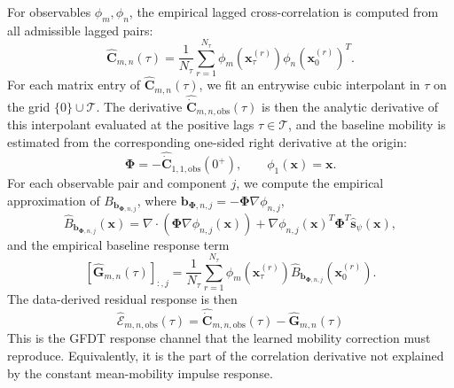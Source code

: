 \documentclass[11pt,twoside,fleqn]{article}
\begin{document}
For observables \(\phi_m,\phi_n\), the empirical lagged cross-correlation is computed from all admissible lagged pairs:
\begin{equation}
    \widehat{\bm{C}}_{m,n}(\tau)
    =
    \frac{1}{N_\tau}
    \sum_{r=1}^{N_\tau}
    \phi_m(\bm{x}^{(r)}_\tau)
    \phi_n(\bm{x}^{(r)}_0)^T.
    \label{eq:app_affine_2d_empirical_correlation}
\end{equation}
For each matrix entry of \(\widehat{\bm{C}}_{m,n}(\tau)\), we fit an entrywise cubic interpolant in \(\tau\) on the grid \(\{0\}\cup\mathcal{T}\). The derivative \(\widehat{\dot{\bm{C}}}_{m,n,\mathrm{obs}}(\tau)\) is then the analytic derivative of this interpolant evaluated at the positive lags \(\tau\in\mathcal{T}\), and the baseline mobility is estimated from the corresponding one-sided right derivative at the origin:
\begin{equation}
    \bm{\Phi}
    =
    -
    \widehat{\dot{\bm{C}}}_{1,1,\mathrm{obs}}(0^+),
    \qquad
    \phi_1(\bm{x})=\bm{x}.
    \label{eq:app_affine_2d_phi_estimator}
\end{equation}
For each observable pair and component \(j\), we compute the empirical
approximation of \(B_{\bm{b}_{\bm{\Phi},n,j}}\), where
\(\bm{b}_{\bm{\Phi},n,j}=-\bm{\Phi}\nabla\phi_{n,j}\),
\begin{equation}
    \widehat{B}_{\bm{b}_{\bm{\Phi},n,j}}(\bm{x})
    =
    \nabla\cdot
    \left(
        \bm{\Phi}\nabla\phi_{n,j}(\bm{x})
    \right)
    +
    \nabla\phi_{n,j}(\bm{x})^T\bm{\Phi}^T
    \widehat{\bm{s}}_\psi(\bm{x}),
    \label{eq:app_affine_2d_gamma_hat}
\end{equation}
and the empirical baseline response term
\begin{equation}
    \left[\widehat{\bm{G}}_{m,n}(\tau)\right]_{:,j}
    =
    \frac{1}{N_\tau}
    \sum_{r=1}^{N_\tau}
    \phi_m(\bm{x}^{(r)}_\tau)
    \widehat{B}_{\bm{b}_{\bm{\Phi},n,j}}(\bm{x}^{(r)}_0).
    \label{eq:app_affine_2d_G_hat}
\end{equation}
The data-derived residual response is then
\begin{equation}
    \widehat{\bm{\mathcal E}}_{m,n,\mathrm{obs}}(\tau)
    =
    \widehat{\dot{\bm{C}}}_{m,n,\mathrm{obs}}(\tau)
    -
    \widehat{\bm{G}}_{m,n}(\tau)
    \label{eq:app_affine_2d_E_hat}
\end{equation}
This is the GFDT response channel that the learned mobility correction must
reproduce. Equivalently, it is the part of the correlation derivative not
explained by the constant mean-mobility impulse response.
\end{document}
